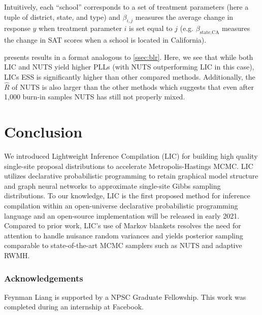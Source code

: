 \documentclass[thesis.tex]{subfiles}
\begin{document}
Intuitively, each ``school'' corresponds to a set of treatment parameters
(here a tuple of district, state, and type) and $\beta_{i,j}$ measures the
average change in response $y$ when treatment parameter $i$ is set equal to
$j$ (e.g. $\beta_{\text{state},\text{CA}}$ measures the change in SAT scores
when a school is located in California).

 presents results in a format analogous to
\cref{ssec:blr}. Here, we see that while both LIC and NUTS yield higher PLLs
(with NUTS outperforming LIC in this case), LICs ESS is significantly higher
than other compared methods. Additionally, the $\widehat{R}$ of NUTS is also
larger than the other methods which suggests that even after 1,000 burn-in samples
NUTS has still not properly mixed.

\section{Conclusion}

We introduced Lightweight Inference Compilation (LIC) for building high
quality single-site proposal distributions to accelerate Metropolis-Hastings
MCMC. LIC utilizes declarative probabilistic programming to retain graphical
model structure and graph neural networks to approximate single-site Gibbs
sampling distributions. To our knowledge, LIC is the first proposed method
for inference compilation within an open-universe declarative probabilistic
programming language and an open-source implementation will be released in
early 2021. Compared to prior work, LIC's use of Markov blankets resolves the
need for attention to handle nuisance random variances and yields posterior
sampling comparable to state-of-the-art MCMC samplers such as NUTS and
adaptive RWMH.

\subsubsection*{Acknowledgements}
Feynman Liang is supported by a NPSC Graduate Fellowship.
This work was completed during an internship at Facebook.

% 
\end{document}
